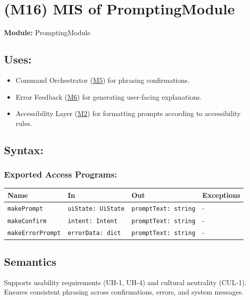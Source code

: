 \documentclass[12pt, titlepage]{article}
\begin{document}
\label{MIS:M16}

\section{(M16) MIS of PromptingModule} \label{M16}

\textbf{Module:} PromptingModule

\subsection{Uses:}
\begin{itemize}
\item Command Orchestrator (\hyperref[M5]{M5}) for phrasing confirmations.
\item Error Feedback (\hyperref[M6]{M6}) for generating user-facing explanations.
\item Accessibility Layer (\hyperref[M2]{M2}) for formatting prompts according to accessibility rules.
\end{itemize}

\subsection{Syntax:}

\subsubsection{Exported Access Programs:}

\begin{tabular}{|l|l|l|l|}
\hline
\textbf{Name} & \textbf{In} & \textbf{Out} & \textbf{Exceptions} \\ \hline
\texttt{makePrompt} & \texttt{uiState: UiState} & \texttt{promptText: string} & - \\ 
\texttt{makeConfirm} & \texttt{intent: Intent} & \texttt{promptText: string} & - \\ 
\texttt{makeErrorPrompt} & \texttt{errorData: dict} & \texttt{promptText: string} & - \\ \hline
\end{tabular}

\subsection{Semantics}

Supports usability requirements (UH-1, UH-4) and cultural neutrality (CUL-1).
Ensures consistent phrasing across confirmations, errors, and system messages.
\end{document}
